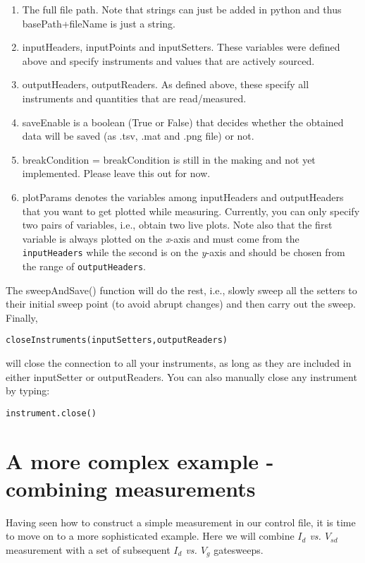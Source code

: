 \begin{enumerate}
\item The full file path. Note that strings can just be added in python and thus basePath+fileName is just a string.
\item inputHeaders, inputPoints and inputSetters. These variables were defined above and specify instruments and values that are actively sourced.
\item outputHeaders, outputReaders. As defined above, these specify all instruments and quantities that are read/measured.
\item saveEnable is a boolean (True or False) that decides whether the obtained data will be saved (as .tsv, .mat and .png file) or not.
\item breakCondition = breakCondition is still in the making and not yet implemented. Please leave this out for now.
\item plotParams denotes the variables among inputHeaders and outputHeaders that you want to get plotted while measuring. Currently, you can only specify two pairs of variables, i.e., obtain two live plots. Note also that the first variable is always plotted on the \textit{x}-axis and must come from the \texttt{inputHeaders} while the second is on the \textit{y}-axis and should be chosen from the range of \texttt{outputHeaders}.
\end{enumerate}

The sweepAndSave() function will do the rest, i.e., slowly sweep all the setters to their initial sweep point (to avoid abrupt changes) and then carry out the sweep. Finally,\\

\begin{verbatim}
closeInstruments(inputSetters,outputReaders)
\end{verbatim}

will close the connection to all your instruments, as long as they are included in either inputSetter or outputReaders. You can also manually close any instrument by typing:\\

\begin{verbatim}
instrument.close()
\end{verbatim}

\section{A more complex example - combining measurements}
Having seen how to construct a simple measurement in our control file, it is time to move on to a more sophisticated example. Here we will combine \textit{$I_d$ vs. $V_{sd}$} measurement with a set of subsequent \textit{$I_d$ vs. $V_g$} gatesweeps.\\

